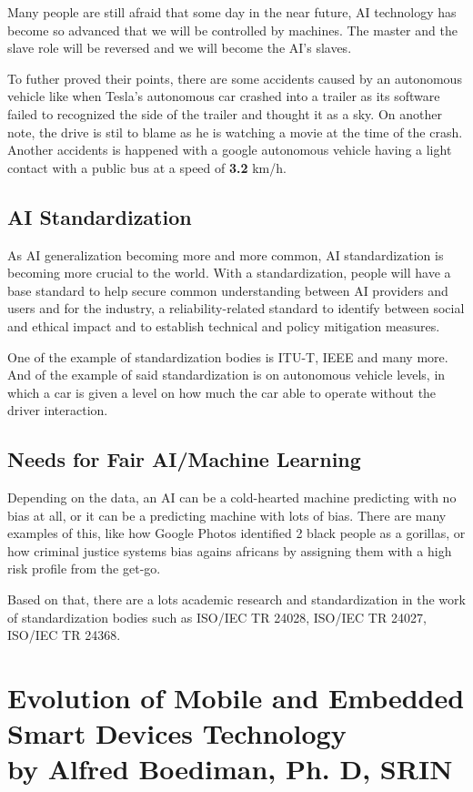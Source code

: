 \documentclass[12pt, a4paper]{article}
\begin{document}
Many people are still afraid that some day in the near future, AI technology has become so advanced that we will be controlled by machines. The master and the slave role will be reversed and we will become the AI's slaves.

To futher proved their points, there are some accidents caused by an autonomous vehicle like when Tesla's autonomous car crashed into a trailer as its software failed to recognized the side of the trailer and thought it as a sky. On another note, the drive is stil to blame as he is watching a movie at the time of the crash. Another accidents is happened with a google autonomous vehicle having a light contact with a public bus at a speed of \textbf{3.2} km/h.

\subsection*{AI Standardization}

As AI generalization becoming more and more common, AI standardization is becoming more crucial to the world. With a standardization, people will have a base standard to help secure common understanding between AI providers and users and for the industry, a reliability-related standard to identify between social and ethical impact and to establish technical and policy mitigation measures.

One of the example of standardization bodies is ITU-T, IEEE and many more. And of the example of said standardization is on autonomous vehicle levels, in which a car is given a level on how much the car able to operate without the driver interaction.

\subsection*{Needs for Fair AI/Machine Learning}

Depending on the data, an AI can be a cold-hearted machine predicting with no bias at all, or it can be a predicting machine with lots of bias. There are many examples of this, like how Google Photos identified 2 black people as a gorillas, or how criminal justice systems bias agains africans by assigning them with a high risk profile from the get-go.

Based on that, there are a lots academic research and standardization in the work of standardization bodies such as ISO/IEC TR 24028, ISO/IEC TR 24027, ISO/IEC TR 24368.

\section*{Evolution of Mobile and Embedded Smart Devices Technology \\ \footnotesize by Alfred Boediman, Ph. D, SRIN}
\end{document}
